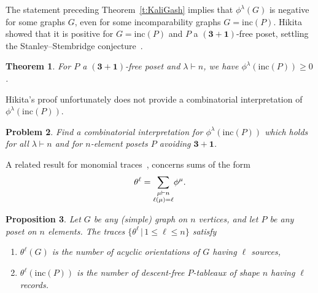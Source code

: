 \documentclass[12pt]{amsart}
\newtheorem{thm}{Theorem}[section]
\newtheorem{prop}[thm]{Proposition}
\newtheorem{prob}[thm]{Problem}
\numberwithin{equation}{section}
\newcommand{\sn}{\mathfrak{S}_n}
\newcommand{\sumsb}[1]{\sum_{\substack{#1}}}  %
\newcommand{\ntnsp}{\negthinspace}
\newcommand{\bp}{\begin{prob}}
\newcommand{\ep}{\end{prob}}
\newcommand{\inc}{\mathrm{inc}}
\newcommand{\rec}{\mathrm{rec}}
\newcommand{\des}{\mathrm{des}}
\begin{document}
The statement preceding Theorem~\ref{t:KaliGash} implies
that $\phi^\lambda(G)$ is negative for some graphs $G$,
even for some incomparability graphs $G = \inc(P)$.
Hikita~\cite[Thm.\,3]{HikitaProof} showed that it is positive
for $G = \inc(P)$ and $P$ a $(\mathbf3 + \mathbf1)$-free poset,
settling the Stanley--Stembridge conjecture~\cite[Conj.\,5.5]{StanStemIJT}.
\begin{thm}\label{t:hikita}
  For $P$ a $(\mathbf3 + \mathbf1)$-free poset
  and $\lambda \vdash n$,
  we have $\phi^\lambda(\inc(P)) \geq 0$.
\end{thm}

\noindent
Hikita's proof unfortunately
does not provide a combinatorial interpretation
of $\phi^\lambda(\inc(P))$.
\bp
Find a combinatorial interpretation for 
$\phi^\lambda(\inc(P))$ which holds for all $\lambda \vdash n$ and for
$n$-element posets $P$ avoiding $\mathbf3 + \mathbf1$.
\ep

A related result for
monomial traces~\cite[Lem.\,4.1]{AthanPSE}, \cite[Thm.\,3.3]{StanSymm}
concerns sums
of the form
  \begin{equation}\label{eq:thetaldef}
    \theta^\ell = \sumsb{\mu \vdash n\\\ell(\mu) = \ell} \ntnsp \phi^\mu.
  \end{equation}
\begin{prop}\label{p:stanksources}
  Let $G$ be any (simple) graph on $n$ vertices,
  and let $P$ be any poset on $n$ elements.
  The traces $\{ \theta^\ell \,|\, 1 \leq \ell \leq n \}$
  satisfy
  \begin{enumerate}
  \item $\theta^\ell(G)$ is the number of acyclic
    orientations of $G$ having $\ell$ sources,
    \item
      $\theta^\ell(\inc(P))$ is the number of
      descent-free $P$-tableaux of shape $n$ having $\ell$
      records.
  \end{enumerate}
\end{prop}

\end{document}
